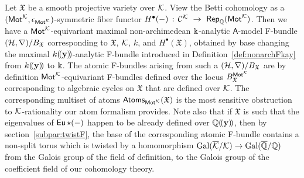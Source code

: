 \documentclass[twoside,leqno]{article}
\numberwithin{equation}{section}
\theoremstyle{plain}
\theoremstyle{definition}
\begin{document}
Let $\mathfrak{X}$ be a smooth projective variety over $\mathcal K$. View the Betti cohomology as a \linebreak $(\mathsf{Mot}^{\mathcal K},\epsilon_{\mathsf{Mot}^{\mathcal K}})$-symmetric fiber functor 
$H^{\bullet}(-) \, : \, \mathcal{C}^{\mathcal K} \ \to \ \mathsf{Rep}_{\mathbb Q}(\mathsf{Mot}^{\mathcal K})$. Then we have a $\mathsf{Mot}^{\mathcal K}$-equivariant maximal non-archimedean $\Bbbk$-analytic $\mathsf{A}$-model F-bundle $(\mathcal H,\nabla)/B_{\mathfrak{X}}$   corresponding to $\mathfrak{X}$, $\mathcal K$, $k$, and $H^{\bullet}(\mathfrak{X})$, obtained by base changing the maximal $k(\!(\mathbf{y})\!)$-analytic F-bundle introduced in Definition~\ref{def:nonarchFkay} from $k(\!(\mathbf{y})\!)$ to $\Bbbk$. The atomic F-bundles arising from such a $(\mathcal H,\nabla)/B_{\mathfrak{X}}$ are by definition 
$\mathsf{Mot}^{\mathcal K}$-equivariant F-bundles defined over the locus $B_{\mathfrak{X}}^{\mathsf{Mot}^{\mathcal K}}$ corresponding to algebraic cycles on $\mathfrak{X}$ that are defined over $\mathcal K$. The corresponding multiset of atoms $\mathsf{Atoms}_{\mathsf{Mot}^{\mathcal K}}(\mathfrak{X})$ is the most sensitive obstruction to $\mathcal K$-rationality our atom formalism provides.  Note also that if $\mathfrak{X}$ is such that the eigenvalues of $\operatorname{\mathsf{Eu}}\star(-)$ happen to be already defined over $\mathbb Q(\!(\mathbf{y})\!)$, then by section~\ref{subpar:twistF}, the base of the corresponding atomic F-bundle contains a non-split torus which is twisted by a homomorphism 
$\operatorname{Gal}(\overline{\mathcal K}/\mathcal K) \to \operatorname{Gal}(\overline{\mathbb Q}/\mathbb Q)$ from the Galois group of the field of definition, to the Galois group of the coefficient field of our cohomology theory.

\medskip
\end{document}
